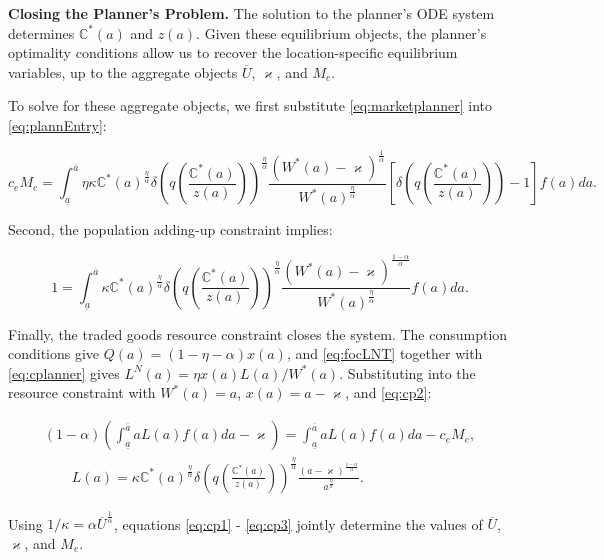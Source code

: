 \noindent \textbf{Closing the Planner's Problem.} 
The solution to the planner's ODE system determines $\mathbb{C}^*(a)$ and $z(a)$. Given these equilibrium objects, the planner's optimality conditions allow us to recover the location-specific equilibrium variables, up to the aggregate objects $\overline{U}$, $\varkappa$, and $M_e$. 

To solve for these aggregate objects, we first substitute \eqref{eq:marketplanner} into \eqref{eq:plannEntry}:

\begin{equation}\label{eq:cp1}
    c_e M_e = \int_{\underline{a}}^{\overline{a}} \eta \kappa \mathbb{C}^*(a)^{\frac{\eta}{\alpha}} \delta\left(q\left(\frac{\mathbb{C}^*(a)}{z(a)}\right)\right)^{\frac{\eta}{\alpha}} \frac{(W^*(a) - \varkappa)^\frac{1}{\alpha}}{W^*(a)^\frac{\eta}{\alpha}} \left[\delta\left(q\left(\frac{\mathbb{C}^*(a)}{z(a)}\right)\right) - 1\right] f(a) da.
\end{equation}

Second, the population adding-up constraint implies:

\begin{equation}\label{eq:cp2}
    1 = \int_{\underline{a}}^{\overline{a}} \kappa \mathbb{C}^*(a)^{\frac{\eta}{\alpha}} \delta\left(q\left(\frac{\mathbb{C}^*(a)}{z(a)}\right)\right)^{\frac{\eta}{\alpha}} \frac{(W^*(a) - \varkappa)^\frac{1-\alpha}{\alpha}}{W^*(a)^\frac{\eta}{\alpha}} f(a) da.
\end{equation}

Finally, the traded goods resource constraint closes the system. The consumption conditions give $Q(a) = (1 - \eta - \alpha) x(a)$, and \eqref{eq:focLNT} together with \eqref{eq:cplanner} gives $L^{N}(a) = \eta x(a) L(a)/W^*(a)$. Substituting into the resource constraint with $W^*(a) = a$, $x(a) = a - \varkappa$, and \eqref{eq:cp2}:

\begin{gather}
    (1 - \alpha) \left( \int_{\underline{a}}^{\overline{a}} a L(a) f(a) da - \varkappa \right) = \int_{\underline{a}}^{\overline{a}} a L(a) f(a) da - c_e M_e, \label{eq:cp3} \\
    \qquad L(a) = \kappa \mathbb{C}^*(a)^{\frac{\eta}{\alpha}} \delta\left(q\left(\frac{\mathbb{C}^*(a)}{z(a)}\right)\right)^{\frac{\eta}{\alpha}} \frac{(a - \varkappa)^\frac{1-\alpha}{\alpha}}{a^\frac{\eta}{\alpha}}. \nonumber
\end{gather}

Using $1/\kappa = \alpha \overline{U}^{\frac{1}{\alpha}}$, equations \eqref{eq:cp1} - \eqref{eq:cp3} jointly determine the values of $\overline{U}$, $\varkappa$, and $M_e$. 


